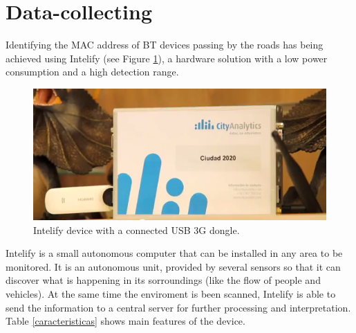 \documentclass[preprint,authoryear,12pt]{elsarticle}
\begin{document}
\section{Data-collecting}
\label{sec:data}

Identifying the MAC address of BT devices passing by the roads has being achieved using Intelify (see Figure \ref{intelify}), a hardware solution with a low power consumption and a high detection range.

\begin{figure}[htpb] 
\begin{center} 
\includegraphics[scale=0.5]{intelifychisme1.png}
\end{center} 
\caption{Intelify device with a connected USB 3G dongle.} 
\label{intelify} 
\end{figure}

Intelify is a small autonomous computer that can be installed in any area to be monitored. It is an autonomous unit, provided by several sensors so that it can discover what is happening in its sorroundings (like the flow of people and vehicles). At the same time the enviroment is been scanned, Intelify is able to send the information to a central server for further processing and interpretation. Table \ref{caracteristicas} shows main features of the device.
\end{document}
